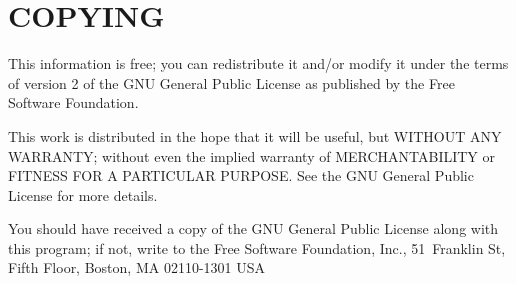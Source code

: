\section{COPYING}


This information is free; you can redistribute it and/or modify
it under the terms of version 2 of the GNU General Public License as
published by the Free Software Foundation.

This work is distributed in the hope that it will be useful,
but WITHOUT ANY WARRANTY; without even the implied warranty of
MERCHANTABILITY or FITNESS FOR A PARTICULAR PURPOSE.  See the
GNU General Public License for more details.

You should have received a copy of the GNU General Public License
along with this program; if not, write to the Free Software
Foundation, Inc., 51~Franklin St, Fifth Floor, Boston, MA  02110-1301  USA
